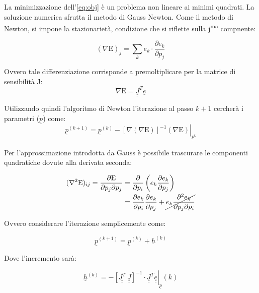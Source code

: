 La minimizzazione dell'\cref{eq:obj} è un problema non lineare ai minimi quadrati. La soluzione numerica sfrutta il metodo di Gauss Newton. Come il metodo di Newton, si impone la stazionarietà, condizione che si riflette sulla j\textsuperscript{ma} compnente:

\begin{equation}
	(\nabla \mathrm {E})_{j}=\sum_{k} e_{k} \cdot \frac{\partial e_{k}}{\partial p_{j}}
\end{equation}

Ovvero tale differenziazione corrisponde a premoltiplicare per la matrice di sensibilità J:
\begin{equation}
\nabla \mathrm{E}=\underline{\underline{J}}^{T} \underline{e}
\end{equation}

Utilizzando quindi l'algoritmo di Newton l'iterazione al passo $k+1$ cercherà i parametri ($\underline p$) come:
\begin{equation}
\underline{p}^{(k+1)}=\underline{p}^{(k)}-\left.[\nabla \left(\nabla \mathrm E\right)]^{-1} \left(\nabla \mathrm E \right)\right|_{\underline{p}^{k}}	
\end{equation}

Per l'approssimazione introdotta da Gauss \cite{nocedal_numerical_2006} è possibile trascurare le componenti quadratiche dovute alla derivata seconda: 

\begin{equation}
	\begin{aligned}
	(\nabla^2 \mathrm{E})_{i j}=\frac{\partial \mathrm{E}}{\partial p_{j} \partial p_{j}}&=\frac{\partial}{\partial p_{i}}\left(e_{k} \frac{\partial e_{k}}{\partial p_{j}}\right)\\&=\frac{\partial e_{k}}{\partial p_{i}} \frac{\partial e_{k}}{\partial p_{j}}+\cancel{e_{k} \frac{\partial^{2} e_{k}}{\partial p_{j} \partial p_{i}}}	
	\end{aligned}	
\end{equation}

Ovvero considerare l'iterazione semplicemente come:

\begin{equation}
\underline{p}^{(k+1)}=\underline{p}^{(k)}+\underline h^{(k)}
\end{equation}

Dove l'incremento sarà:

\begin{equation}
\underline h^{(k)}=-\left.\left[\underline{\underline{J^{T}}} \:\underline{\underline{J}}\right]^{-1} \cdot \underline{\underline{J}}^{T} \underline{\underline{e}}\right|_{\underline{p}}(k)
\end{equation}

